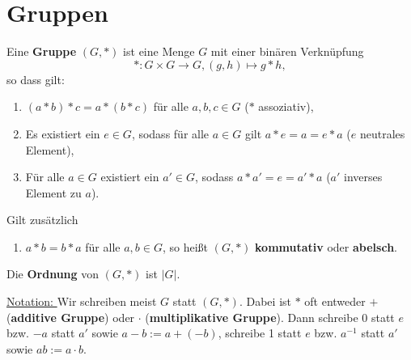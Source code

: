 \section{Gruppen}
\begin{definition}
	Eine \textbf{Gruppe} $(G, *)$ ist eine Menge $G$ mit einer binären Verknüpfung 
	\[* \colon G \times G \to G, (g,h) \mapsto g*h,\]
	so dass gilt:
	\begin{enumerate}[label={\bfseries(G\arabic*)}]
		\item $(a * b) * c  = a * (b * c)$ für alle $a,b,c \in G$ ($*$ assoziativ),
		\item Es existiert ein $e \in G$, sodass für alle $a \in G$ gilt $a * e = a = e * a$ ($e$ neutrales Element),
		\item Für alle $a \in G$ existiert ein $a' \in G$, sodass $a * a' = e = a' * a$ ($a'$ inverses Element zu $a$).
	\end{enumerate}
	Gilt zusätzlich
	\begin{enumerate}[start=4, label={\bfseries(G\arabic*)}]
		\item $a * b = b * a$ für alle $a,b \in G$, so heißt $(G, *)$ \textbf{kommutativ} oder \textbf{abelsch}.
	\end{enumerate}
	Die \textbf{Ordnung} von $(G, *)$ ist $|G|$.
\end{definition}
\underline{Notation: } Wir schreiben meist $G$ statt $(G, *)$. Dabei ist $*$ oft entweder $+$ (\textbf{additive Gruppe}) oder $\cdot$ (\textbf{multiplikative Gruppe}). Dann schreibe 0 statt $e$ bzw. $-a$ statt $a'$ sowie $a-b := a + (-b)$, schreibe 1 statt $e$ bzw. $a^{-1}$ statt $a'$ sowie $ab := a \cdot b$.
